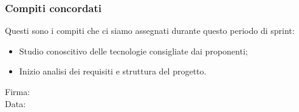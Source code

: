 \documentclass[12pt]{article}
\begin{document}
\subsubsection{Compiti concordati}
Questi sono i compiti che ci siamo assegnati durante questo periodo di sprint:
\begin{itemize}
	\item Studio conoscitivo delle tecnologie consigliate dai proponenti;
	\item Inizio analisi dei requisiti e struttura del progetto.
\end{itemize}

\vfill
\begin{minipage}{10cm}
Firma: \hrulefill \\
\vspace{2mm}
Data: \dotfill
\end{minipage}
\end{document}
